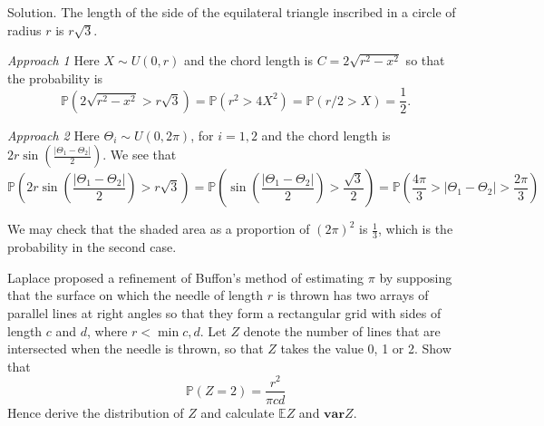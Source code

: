 Solution. The length of the side of the equilateral triangle inscribed in a circle of radius $r$ is $r\sqrt{3}$.

\emph{Approach 1} Here $X\sim U(0,r)$ and the chord length is $C=2\sqrt{r^2-x^2}$ so that the probability is 
\begin{equation}
\mathbb{P}\left(2\sqrt{r^2-x^2} >r\sqrt{3}\right) = \mathbb{P}\left(r^2>4X^2\right) = \mathbb{P}\left(r/2>X\right) = \frac 12.
\end{equation}

\emph{Approach 2} Here $\Theta_i\sim U(0,2\pi)$, for $i=1,2$ and the chord length is $2r\sin\left(\frac{|\Theta_1-\Theta_2|}{2}\right)$. We see that 
\begin{equation}
\mathbb{P}\left(2r\sin\left(\frac{|\Theta_1-\Theta_2|}{2}\right) >r\sqrt{3}\right) = \mathbb{P}\left(\sin\left(\frac{|\Theta_1-\Theta_2|}{2}\right) >\frac{\sqrt{3}}{2}\right) = \mathbb{P}\left(\frac{4\pi}{3}>|\Theta_1-\Theta_2| > \frac{2\pi}{3}\right) 
\end{equation}

We may check that the shaded area as a proportion of $(2\pi)^2$ is $\frac 13$, which is the probability in the second case.



\item Laplace proposed a refinement of Buffon's method of estimating $\pi$ by supposing that the surface on which the needle of length $r$ is thrown has two arrays of parallel lines at right angles so that they form a rectangular grid with sides of length $c$ and $d$, where $r<\min{c,d}$. Let $Z$ denote the number of lines that are intersected when the needle is thrown, so that $Z$ takes the value 0, 1 or 2. Show that
\begin{equation}
\mathbb{P}(Z=2)=\frac{r^2}{\pi cd}
\end{equation}
Hence derive the distribution of $Z$ and calculate $\mathbb{E}Z$ and $\mathbf{var}Z$.



